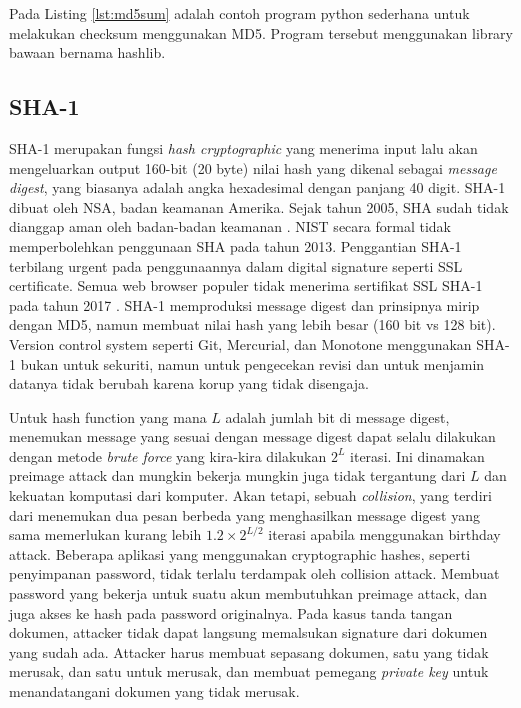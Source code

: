 Pada Listing \ref{lst:md5sum} adalah contoh program python sederhana untuk melakukan checksum menggunakan MD5. Program tersebut menggunakan library bawaan bernama hashlib.

\subsection{SHA-1}
\label{subsec:SHA1}

SHA-1 merupakan fungsi \emph{hash cryptographic} yang menerima input lalu akan mengeluarkan output 160-bit (20 byte) nilai hash yang dikenal sebagai \emph{message digest}, yang biasanya adalah angka hexadesimal dengan panjang 40 digit. SHA-1 dibuat oleh NSA, badan keamanan Amerika. Sejak tahun 2005, SHA sudah tidak dianggap aman oleh badan-badan keamanan \citep{schneier2005}. NIST secara formal tidak memperbolehkan penggunaan SHA pada tahun 2013. Penggantian SHA-1 terbilang urgent pada penggunaannya dalam digital signature seperti SSL certificate. Semua web browser populer tidak menerima sertifikat SSL SHA-1 pada tahun 2017 \citep{mozilla2019,google2015}. SHA-1 memproduksi message digest dan prinsipnya mirip dengan MD5, namun membuat nilai hash yang lebih besar (160 bit vs 128 bit). Version control system seperti Git, Mercurial, dan Monotone menggunakan SHA-1 bukan untuk sekuriti, namun untuk pengecekan revisi dan untuk menjamin datanya tidak berubah karena korup yang tidak disengaja.

Untuk hash function yang mana \(L\) adalah jumlah bit di message digest, menemukan message yang sesuai dengan message digest dapat selalu dilakukan dengan metode \emph{brute force} yang kira-kira dilakukan \(2^L\) iterasi. Ini dinamakan preimage attack dan mungkin bekerja mungkin juga tidak tergantung dari \(L\) dan kekuatan komputasi dari komputer. Akan tetapi, sebuah \emph{collision}, yang terdiri dari menemukan dua pesan berbeda yang menghasilkan message digest yang sama memerlukan kurang lebih \(1.2\times{2^{L/2}}\) iterasi apabila menggunakan birthday attack. Beberapa aplikasi yang menggunakan cryptographic hashes, seperti penyimpanan password, tidak terlalu terdampak oleh collision attack. Membuat password yang bekerja untuk suatu akun membutuhkan preimage attack, dan juga akses ke hash pada password originalnya. Pada kasus tanda tangan dokumen, attacker tidak dapat langsung memalsukan signature dari dokumen yang sudah ada. Attacker harus membuat sepasang dokumen, satu yang tidak merusak, dan satu untuk merusak, dan membuat pemegang \emph{private key} untuk menandatangani dokumen yang tidak merusak.

